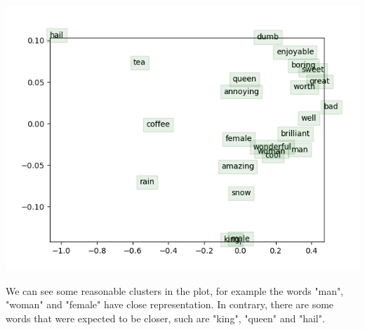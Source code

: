 \includegraphics{word_vectors.png}

We can see some reasonable clusters in the plot, for example the words "man", "woman" and "female" have close representation.
In contrary, there are some words that were expected to be closer, such are "king", "queen" and "hail".